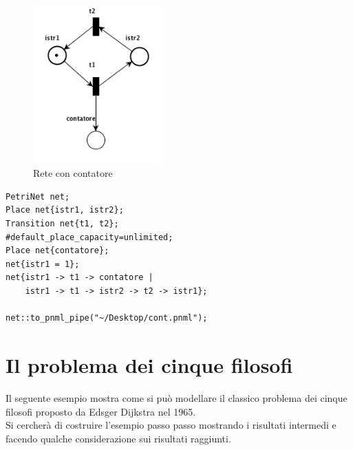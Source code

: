 \documentclass[italian,12pt]{book}
\begin{document}
\begin{figure}[htb]
\centerline{\includegraphics[width=5cm]{img/contatore.png}}
\caption{Rete con contatore}\label{fig:contatore.png}
\end{figure}

\begin{verbatim}PetriNet net;
Place net{istr1, istr2};
Transition net{t1, t2};
#default_place_capacity=unlimited;
Place net{contatore};
net{istr1 = 1};
net{istr1 -> t1 -> contatore | 
    istr1 -> t1 -> istr2 -> t2 -> istr1};

net::to_pnml_pipe("~/Desktop/cont.pnml");

\end{verbatim}

\newpage

\section{Il problema dei cinque filosofi}
Il seguente esempio mostra come si può modellare il classico problema
dei cinque filosofi proposto da Edsger Dijkstra nel 1965. \\
Si cercherà di costruire l'esempio passo passo mostrando 
i risultati intermedi e facendo qualche considerazione sui risultati raggiunti.\\
\end{document}
